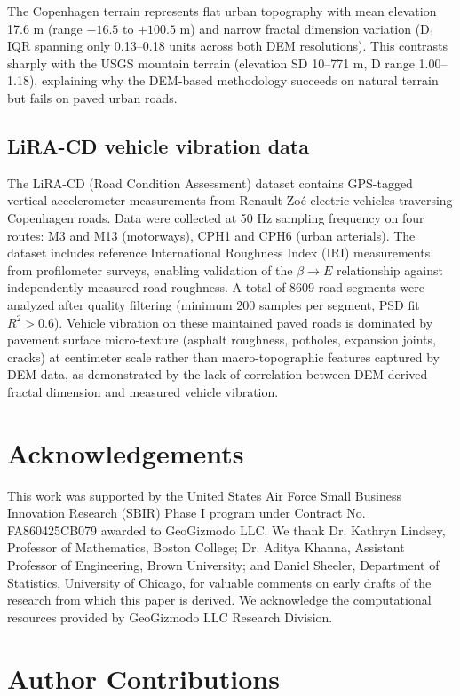 \documentclass[11pt,letterpaper]{article}
\begin{document}
The Copenhagen terrain represents flat urban topography with mean elevation 17.6 m (range $-16.5$ to $+100.5$ m) and narrow fractal dimension variation (D$_1$ IQR spanning only 0.13--0.18 units across both DEM resolutions). This contrasts sharply with the USGS mountain terrain (elevation SD 10--771 m, D range 1.00--1.18), explaining why the DEM-based methodology succeeds on natural terrain but fails on paved urban roads.

\subsection{LiRA-CD vehicle vibration data}

The LiRA-CD (Road Condition Assessment) dataset\cite{Skar2023} contains GPS-tagged vertical accelerometer measurements from Renault Zoé electric vehicles traversing Copenhagen roads. Data were collected at 50 Hz sampling frequency on four routes: M3 and M13 (motorways), CPH1 and CPH6 (urban arterials). The dataset includes reference International Roughness Index (IRI) measurements from profilometer surveys, enabling validation of the $\beta \rightarrow E$ relationship against independently measured road roughness. A total of 8609 road segments were analyzed after quality filtering (minimum 200 samples per segment, PSD fit $R^2 > 0.6$). Vehicle vibration on these maintained paved roads is dominated by pavement surface micro-texture (asphalt roughness, potholes, expansion joints, cracks) at centimeter scale rather than macro-topographic features captured by DEM data, as demonstrated by the lack of correlation between DEM-derived fractal dimension and measured vehicle vibration.

\section*{Acknowledgements}

This work was supported by the United States Air Force Small Business Innovation Research (SBIR) Phase I program under Contract No. FA860425CB079 awarded to GeoGizmodo LLC. We thank Dr. Kathryn Lindsey, Professor of Mathematics, Boston College; Dr. Aditya Khanna, Assistant Professor of Engineering, Brown University; and Daniel Sheeler, Department of Statistics, University of Chicago, for valuable comments on early drafts of the research from which this paper is derived. We acknowledge the computational resources provided by GeoGizmodo LLC Research Division.

\section*{Author Contributions}
\end{document}
